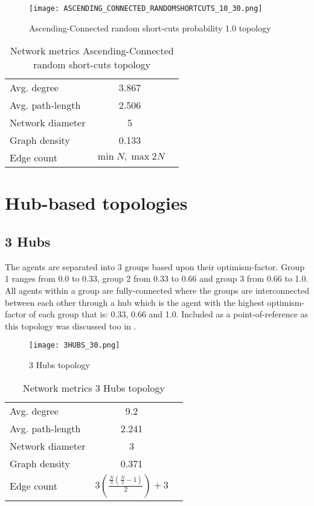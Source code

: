 \documentclass[Bachelorarbeit.tex]{subfiles}
\begin{document}
\begin{figure}[H]
	\centering
  \texttt{[image: ASCENDING\_CONNECTED\_RANDOMSHORTCUTS\_10\_30.png]}
	\caption{Ascending-Connected random short-cuts probability 1.0 topology}
	\label{fig:topology_ASCENDING_CONNECTED_RANDOMSHORTCUTS_10_30}
\end{figure}

\begin{table}[H]
	\centering
	\caption{Network metrics Ascending-Connected random short-cuts topology}
	\begin{tabular} { l c r }
		\hline
		Avg. degree & 3.867 \\
		Avg. path-length & 2.506 \\
		Network diameter & 5 \\
		Graph density & 0.133\\
		Edge count & $\min N, \max 2N$ \\
		\hline
	\end{tabular}
\end{table}

\pagebreak

\section{Hub-based topologies}
\subsection{3 Hubs}
The agents are separated into 3 groups based upon their optimism-factor. Group 1 ranges from 0.0 to 0.33, group 2 from 0.33 to 0.66 and group 3 from 0.66 to 1.0. All agents within a group are fully-connected where the groups are interconnected between each other through a hub which is the agent with the highest optimism-factor of each group that is: 0.33, 0.66 and 1.0. Included as a point-of-reference as this topology was discussed too in \cite{Breuer2015}.

\begin{figure}[H]
	\centering
  \texttt{[image: 3HUBS\_30.png]}
	\caption{3 Hubs topology}
	\label{fig:topology_3HUBS_30}
\end{figure}

\begin{table}[H]
	\centering
	\caption{Network metrics 3 Hubs topology}
	\begin{tabular} { l c r }
		\hline
		Avg. degree & 9.2 \\
		Avg. path-length & 2.241 \\
		Network diameter & 3 \\
		Graph density & 0.371\\
		Edge count & $3(\frac{\frac{N}{3}(\frac{N}{3} - 1)}{2}) + 3$ \\
		\hline
	\end{tabular}
\end{table}
\end{document}
